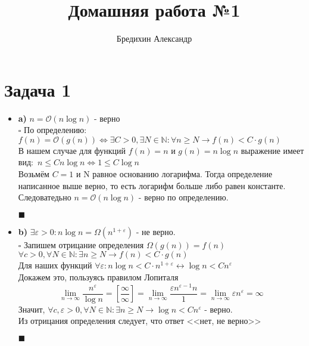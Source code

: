 \documentclass[a4paper,12pt]{article} %
\author{Бредихин Александр}
\title{Домашняя работа №1}
\begin{document}

\maketitle

\section*{Задача 1}

\begin{itemize}
\item \textbf{a)}  $n = \mathcal{O}(n\log{}n)$ - верно\\
$\square$ По определению:\\
$f(n) = \mathcal{O}(g(n)) \Leftrightarrow \exists C>0, \exists N\in\mathbb{N} : \forall n \geq N \rightarrow f(n) < C \cdot g(n)$\\
В нашем случае для функций $f(n) = n$ и $g(n) = n\log{}n$ выражение имеет вид:\
$n \leq Cn\log{}n \Longleftrightarrow 1 \leq C\log{}n$\\
Возьмём $C=1$ и N равное основанию логарифма. Тогда определение написанное выше верно, то есть логарифм больше либо равен константе. Следоватедьно $n = \mathcal{O}(n\log{}n)$ - верно по определению.
\begin{flushright}
	$\blacksquare$
\end{flushright}

\item \textbf{b)} $\exists\varepsilon > 0: n\log{}n = \Omega(n^{1+\varepsilon})$ - не верно.\\
$\square$ Запишем отрицание определения $\Omega(g(n)) = f(n)$\\
$\forall c>0, \forall N\in\mathbb{N}: \exists n \geq N \rightarrow f(n) < C \cdot g(n)$\\
Для наших функций $ \forall\varepsilon: n\log{}n < C \cdot n^{1+\varepsilon} \longleftrightarrow \log{}n < Cn^{\varepsilon}$\\
Докажем это, пользуясь правилом Лопиталя\\
\[ \lim\limits_{n\to\infty}\frac{n^{\varepsilon}}{\log{}n} = \left[ \frac{\infty}{\infty} \right] = 
\lim\limits_{n\to\infty}\frac{\varepsilon n^{\varepsilon - 1}n}{1} = 
\lim\limits_{n\to\infty}\varepsilon n^{\varepsilon} = \infty \]
Значит,
$\forall c,\varepsilon >0, \forall N\in\mathbb{N}: \exists n \geq N \rightarrow \log{}n < Cn^{\varepsilon}$ - верно.\\
Из отрицания определения следует, что ответ <<нет, не верно>>
\begin{flushright}
	$\blacksquare$
\end{flushright}

\end{itemize}
\end{document}
